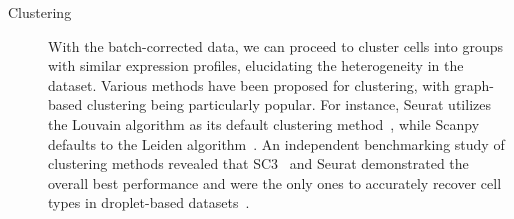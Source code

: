 \begin{description}
	\item[Clustering]
	With the batch-corrected data, we can proceed to cluster cells into groups with similar expression profiles, elucidating the heterogeneity in the dataset. Various methods have been proposed for clustering, with graph-based clustering being particularly popular. For instance, Seurat utilizes the Louvain algorithm as its default clustering method~\citep{stuart2019seurat3}, while Scanpy defaults to the Leiden algorithm~\citep{traag2019louvain}. An independent benchmarking study of clustering methods revealed that SC3~\citep{kiselev2017sc3} and Seurat demonstrated the overall best performance and were the only ones to accurately recover cell types in droplet-based datasets~\citep{duo2018benchclustering}.

\end{description}

